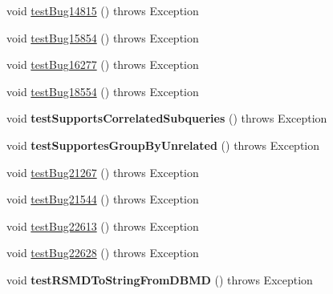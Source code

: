 \begin{DoxyCompactItemize}
\item 
void \mbox{\hyperlink{classtestsuite_1_1regression_1_1_meta_data_regression_test_a0b21041ed61d6a8c105f6d7ee954efbd}{test\+Bug14815}} ()  throws Exception 
\item 
void \mbox{\hyperlink{classtestsuite_1_1regression_1_1_meta_data_regression_test_ae112984f3c8acf28251912e13475421c}{test\+Bug15854}} ()  throws Exception 
\item 
void \mbox{\hyperlink{classtestsuite_1_1regression_1_1_meta_data_regression_test_a7ddf69bf32cb524239b07b822585d44d}{test\+Bug16277}} ()  throws Exception 
\item 
void \mbox{\hyperlink{classtestsuite_1_1regression_1_1_meta_data_regression_test_ac00a7a14db2a9fd6e4c1439959c0a67d}{test\+Bug18554}} ()  throws Exception 
\item 
\mbox{\label{classtestsuite_1_1regression_1_1_meta_data_regression_test_a61c54cc997687666b3987a8c8e3d8647}} 
void {\bfseries test\+Supports\+Correlated\+Subqueries} ()  throws Exception 
\item 
\mbox{\label{classtestsuite_1_1regression_1_1_meta_data_regression_test_ac35d7a3f186c9873b8e3796368af92c6}} 
void {\bfseries test\+Supportes\+Group\+By\+Unrelated} ()  throws Exception 
\item 
void \mbox{\hyperlink{classtestsuite_1_1regression_1_1_meta_data_regression_test_a45d7aaa5c8653a65c36f2e40ee7b154a}{test\+Bug21267}} ()  throws Exception 
\item 
void \mbox{\hyperlink{classtestsuite_1_1regression_1_1_meta_data_regression_test_ad063a1590627c6505de6ff9a64d90ab8}{test\+Bug21544}} ()  throws Exception 
\item 
void \mbox{\hyperlink{classtestsuite_1_1regression_1_1_meta_data_regression_test_a5b7642788b0d18aad6874a2770cfdf5d}{test\+Bug22613}} ()  throws Exception 
\item 
void \mbox{\hyperlink{classtestsuite_1_1regression_1_1_meta_data_regression_test_a1a86a1e268439afcb06e201e8c7bd486}{test\+Bug22628}} ()  throws Exception 
\item 
\mbox{\label{classtestsuite_1_1regression_1_1_meta_data_regression_test_a50b58104e10eaa8f4be185c852cdf1ba}} 
void {\bfseries test\+R\+S\+M\+D\+To\+String\+From\+D\+B\+MD} ()  throws Exception 

\end{DoxyCompactItemize}
